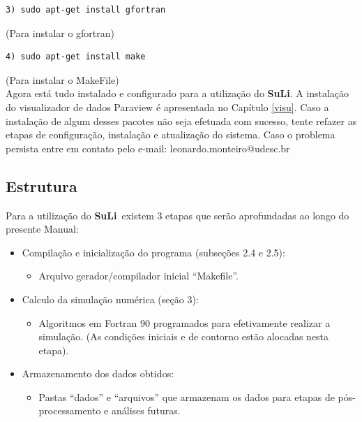 \documentclass[12pt, a4paper]{article}
\newcommand{\SL}{{\bf SuLi}}
\begin{document}
\begin{verbatim}
3) sudo apt-get install gfortran
\end{verbatim}
(Para instalar o gfortran)

\begin{verbatim}
4) sudo apt-get install make
\end{verbatim}
(Para instalar o MakeFile)
\\

Agora está tudo instalado e configurado para a utilização do \SL. A instalação do visualizador de dados Paraview é apresentada no Capítulo \ref{visu}. Caso a instalação de algum desses pacotes não seja efetuada com sucesso, tente refazer as etapas de configuração, instalação e atualização do sistema. Caso o problema persista entre em contato pelo e-mail: leonardo.monteiro@udesc.br

\subsection{Estrutura}
Para a utilização do \SL\ existem 3 etapas que serão aprofundadas ao longo do presente Manual:
\begin{itemize}
	\item Compilação e inicialização do programa (subseções 2.4 e 2.5):
		\begin{itemize}
			\item Arquivo gerador/compilador inicial ``Makefile''.
		\end{itemize}
	\item Calculo da simulação numérica (seção 3):
		\begin{itemize}
			\item Algoritmos em Fortran 90 programados para efetivamente realizar a simulação. (As condições iniciais e de contorno estão alocadas nesta etapa).
		\end{itemize}
	\item Armazenamento dos dados obtidos:
		\begin{itemize}
			\item Pastas ``dados'' e ``arquivos'' que armazenam os dados para etapas de pós-processamento e análises futuras.
		\end{itemize}
\end{itemize}
\end{document}
